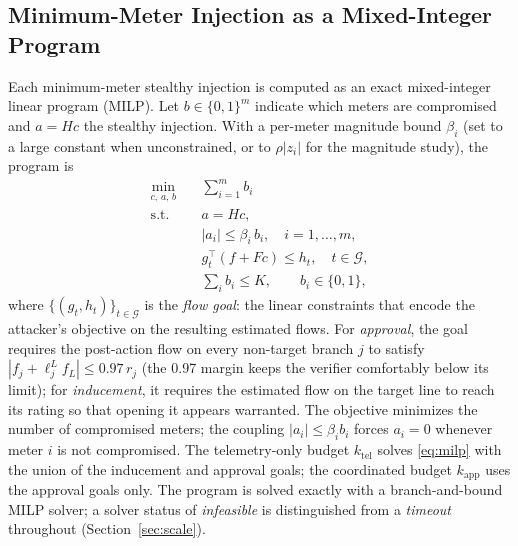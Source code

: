 \documentclass{ieeeaccess}
\begin{document}
\subsection{Minimum-Meter Injection as a Mixed-Integer Program}
Each minimum-meter stealthy injection is computed as an exact mixed-integer linear program (MILP). Let $b\in\{0,1\}^{m}$ indicate which meters are compromised and $a=Hc$ the stealthy injection. With a per-meter magnitude bound $\beta_i$ (set to a large constant when unconstrained, or to $\rho|z_i|$ for the magnitude study), the program is
\begin{equation}
\begin{aligned}
\min_{c,\,a,\,b}\quad & \sum_{i=1}^{m} b_i \\
\text{s.t.}\quad & a = Hc, \\
& |a_i| \le \beta_i\, b_i, \quad i=1,\dots,m, \\
& g_t^{\top}(f+Fc) \le h_t, \quad t\in\mathcal{G}, \\
& \sum_i b_i \le K,\qquad b_i \in \{0,1\},
\end{aligned}
\label{eq:milp}
\end{equation}
where $\{(g_t,h_t)\}_{t\in\mathcal{G}}$ is the \emph{flow goal}: the linear constraints that encode the attacker's objective on the resulting estimated flows. For \emph{approval}, the goal requires the post-action flow on every non-target branch $j$ to satisfy $|f_j+\ell^{L}_j f_L|\le 0.97\,r_j$ (the 0.97 margin keeps the verifier comfortably below its limit); for \emph{inducement}, it requires the estimated flow on the target line to reach its rating so that opening it appears warranted. The objective minimizes the number of compromised meters; the coupling $|a_i|\le\beta_i b_i$ forces $a_i=0$ whenever meter $i$ is not compromised. The telemetry-only budget $k_{\mathrm{tel}}$ solves \eqref{eq:milp} with the union of the inducement and approval goals; the coordinated budget $k_{\mathrm{app}}$ uses the approval goals only. The program is solved exactly with a branch-and-bound MILP solver; a solver status of \emph{infeasible} is distinguished from a \emph{timeout} throughout (Section~\ref{sec:scale}).
\end{document}
